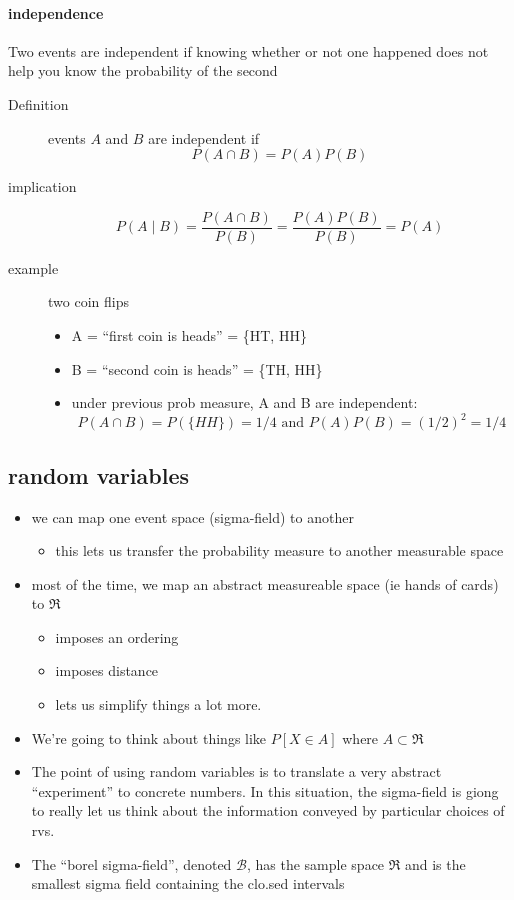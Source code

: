 \paragraph{independence}
\label{sec-1-2-3}

      Two events are independent if knowing whether or not one
      happened does not help you know the probability of the second
\begin{description}
\item[Definition] events $A$ and $B$ are independent if \[P(A \cap
                      B) = P(A) P(B)\]
\item[implication] \[P(A \mid B) = \frac{P(A \cap B)}{P(B)} =
                       \frac{P(A) P(B)}{P(B)} = P(A)\]
\item[example] two coin flips
\begin{itemize}
\item A = ``first coin is heads'' = \{HT, HH\}
\item B = ``second coin is heads'' = \{TH, HH\}
\item under previous prob measure, A and B are independent: \[P(A
          \cap B) = P(\{HH\}) = 1/4 \text{ and } P(A)P(B) = (1/2)^2 = 1/4\]
\end{itemize}
\end{description}
\subsection{random variables}
\label{sec-1-3}

\begin{itemize}
\item we can map one event space (sigma-field) to another
\begin{itemize}
\item this lets us transfer the probability measure to another
        measurable space
\end{itemize}
\item most of the time, we map an abstract measureable space (ie hands
      of cards) to $\Re$
\begin{itemize}
\item imposes an ordering
\item imposes distance
\item lets us simplify things a lot more.
\end{itemize}
\item We're going to think about things like $P[X \in A]$ where $A
      \subset \Re$
\item The point of using random variables is to translate a very
      abstract ``experiment'' to concrete numbers.  In this situation,
      the sigma-field is giong to really let us think about the
      information conveyed by particular choices of rvs.
\item The ``borel sigma-field'', denoted $\mathcal B$, has the sample
      space $\Re$ and is the smallest sigma field containing the
      clo.sed intervals
\end{itemize}
